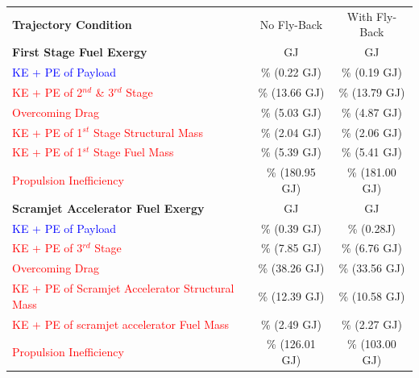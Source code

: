 \begin{table}[!ht]%
	\centering
	\begin{tabular}{l c c} 
		\hline \textbf{Trajectory Condition}
		& No Fly-Back
		& With Fly-Back
		\\
		\textbf{First Stage Fuel Exergy} 
		&\textbf{\firstEnergyStandardNoReturn} GJ
		&\textbf{\firstEnergyStandard} GJ
		\\
		
		\textcolor{blue}{KE + PE of Payload}
		& \firstWpayloadStandardNoReturn \% (0.22 GJ)
		& \firstWpayloadStandard \% (0.19 GJ)
		\\
		\textcolor{red}{KE + PE of  2$^{nd}$ \& 3$^{rd}$ Stage}
		& \firstWnextStageStandardNoReturn \% (13.66 GJ)  & \firstWnextStageStandard \% (13.79 GJ)
		\\
		\textcolor{red}{Overcoming Drag} 
		& \WDoneStandardNoReturn \% (5.03 GJ) & \WDoneStandard \% (4.87 GJ)
		\\
		\textcolor{red}{KE + PE of 1$^{st}$ Stage Structural Mass} 
		& \WoneStandardNoReturn \% (2.04 GJ) & \WoneStandard \% (2.06 GJ)
		\\
		\textcolor{red}{KE + PE of 1$^{st}$ Stage Fuel Mass} 
		& \WmFoneStandardNoReturn \% (5.39 GJ) & \WmFoneStandard \% (5.41 GJ)
		\\ 
		\textcolor{red}{Propulsion Inefficiency} 
		& \PlossoneCombinedStandardNoReturn \% (180.95 GJ) & \PlossoneCombinedStandard \% (181.00 GJ)
		\\ 
		\textbf{Scramjet Accelerator Fuel Exergy} 
		& \textbf{\secondEnergyStandardNoReturn} GJ & \textbf{\secondEnergyStandard} GJ
		\\
		\textcolor{blue}{KE + PE of Payload}
		& \secondWpayloadStandardNoReturn \% (0.39 GJ) & \secondWpayloadStandard \% (0.28J)
		\\
		\textcolor{red}{KE + PE of 3$^{rd}$ Stage}
		& \secondWnextStageStandardNoReturn \% (7.85 GJ) & \secondWnextStageStandard \% (6.76 GJ)
		\\
		\textcolor{red}{Overcoming Drag}
		& \WDsecondStandardNoReturn \% (38.26 GJ) & \WDsecondStandard \% (33.56 GJ)
		\\
		\textcolor{red}{KE + PE of Scramjet Accelerator Structural Mass}  
		& \WsecondStandardNoReturn \% (12.39 GJ) & \WsecondStandard \% (10.58 GJ)
		\\
		\textcolor{red}{KE + PE of scramjet accelerator Fuel Mass}  
		& \WmFsecondStandardNoReturn \% (2.49 GJ) & \WmFsecondStandard \% (2.27 GJ)
		\\
		\textcolor{red}{Propulsion Inefficiency}  
		& \PlosssecondStandardNoReturn \% (126.01 GJ) & \PlosssecondStandard \% (103.00 GJ)
		\\
		

\end{tabular}
\end{table}
